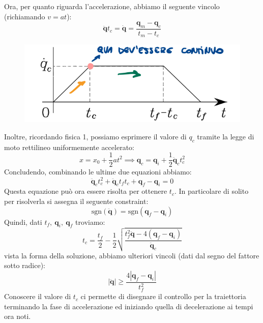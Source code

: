 Ora, per quanto riguarda l'accelerazione, abbiamo il seguente vincolo (richiamando $v = at$):
$$
\bm{\ddot{q}}t_c
=
\bm{\dot{q}}
=
\frac{\bm{q}_m - \bm{q}_c}{t_m - t_c}
$$
\begin{figure}[H]
	\centering
	\includegraphics[width=0.4\linewidth]{images/trajectories_9}
	\label{fig:trajectories9}
\end{figure}
Inoltre, ricordando fisica 1, possiamo esprimere il valore di $q_c$ tramite la legge di moto rettilineo uniformemente accelerato:
$$
x = x_0 + \frac{1}{2}at^2
\implies
\bm{q}_c = \bm{q}_i + \frac{1}{2}\bm{\ddot{q}}_ct_c^2
$$
Concludendo, combinando le ultime due equazioni abbiamo:
$$
\bm{\ddot{q}}_ct_c^2
+
\bm{\ddot{q}}_c t_f t_c
+
\bm{q}_f - \bm{q}_i = 0
$$
Questa equazione può ora essere risolta per ottenere $t_c$. In particolare di solito per risolverla si assegna il seguente constraint:
$$
\text{sgn}(\ddot{\bm{q}})
=
\text{sgn}(\bm{q}_f - \bm{q}_i)
$$
Quindi, dati $t_f, \ \bm{q}_i, \ \bm{q}_f$ troviamo:
\begin{equation}\label{eq:tc_212}
\boxed{
t_c
=
\frac{t_f}{2} - \frac{1}{2}
\sqrt{
\frac{t_f^2 \ddot{\bm{q}} - 4(\bm{q}_f - \bm{q}_i)}{\bm{\ddot{q}}_c}
}
}
\end{equation}
vista la forma della soluzione, abbiamo ulteriori vincoli (dati dal segno del fattore sotto radice):
\begin{equation}\label{eq:qddot_constraint_212}
|\ddot{\bm{q}}| \ge \frac{4|\bm{q}_f - \bm{q}_i|}{t_f^2}
\end{equation}
Conoscere il valore di $t_c$ ci permette di disegnare il controllo per la traiettoria terminando la fase di accelerazione ed iniziando quella di decelerazione ai tempi ora noti.

\vspace*{10pt}
